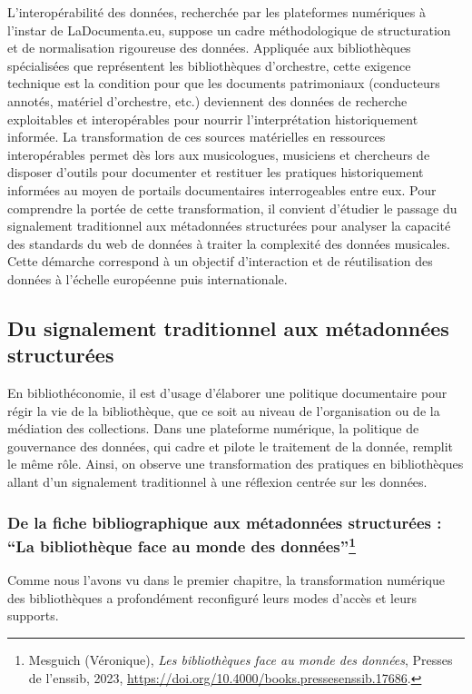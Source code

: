 L'interopérabilité des données, recherchée par les plateformes numériques à l'instar de LaDocumenta.eu, suppose un cadre méthodologique de structuration et de normalisation rigoureuse des données. Appliquée aux bibliothèques spécialisées que représentent les bibliothèques d'orchestre, cette exigence technique est la condition pour que les documents patrimoniaux (conducteurs annotés, matériel d'orchestre, etc.) deviennent des données de recherche exploitables et interopérables pour nourrir l'interprétation historiquement informée. La transformation de ces sources matérielles en ressources interopérables permet dès lors aux musicologues, musiciens et chercheurs de disposer d'outils pour documenter et restituer les pratiques historiquement informées au moyen de portails documentaires interrogeables entre eux. Pour comprendre la portée de cette transformation, il convient d'étudier le passage du signalement traditionnel aux métadonnées structurées pour analyser la capacité des standards du web de données à traiter la complexité des données musicales. Cette démarche correspond à un objectif d'interaction et de réutilisation des données à l'échelle européenne puis internationale.

\subsection*{Du signalement traditionnel aux métadonnées structurées}

En bibliothéconomie, il est d'usage d'élaborer une politique documentaire pour régir la vie de la bibliothèque, que ce soit au niveau de l'organisation ou de la médiation des collections. Dans une plateforme numérique, la politique de gouvernance des données, qui cadre et pilote le traitement de la donnée, remplit le même rôle. Ainsi, on observe une transformation des pratiques en bibliothèques allant d'un signalement traditionnel à une réflexion centrée sur les données.

\subsubsection*{De la fiche bibliographique aux métadonnées structurées : \enquote{La bibliothèque face au monde des données}\footnote{Mesguich (Véronique), \textit{Les bibliothèques face au monde des données}, Presses de l’enssib, 2023, \url{https://doi.org/10.4000/books.pressesenssib.17686}.}}

Comme nous l'avons vu dans le premier chapitre, la transformation numérique des bibliothèques a profondément reconfiguré leurs modes d'accès et leurs supports.

